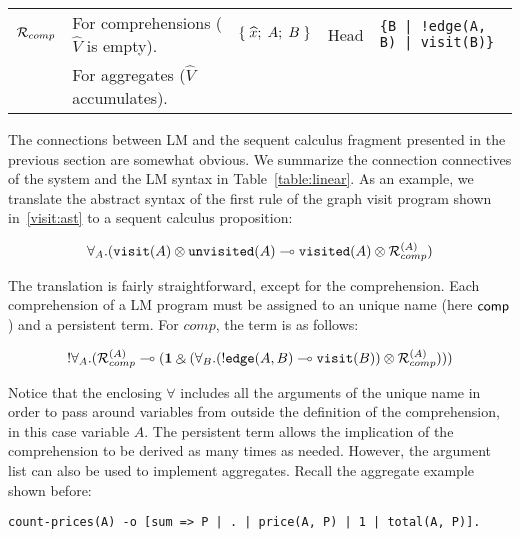 \begin{table*}
\begin{center}
{\begin{tabular}{ | l | l || l | l | l |}
    $\mathcal{R}_{comp}$               & For comprehensions
    ($\widehat{V}$ is empty).  & $\{ \; \widehat{x}; \; A; \; B \; \}$  & Head            & \texttt{\{B | !edge(A, B) | visit(B)\}}        \\
                                 & For aggregates ($\widehat{V}$ accumulates).          &                                               &                 &                                                \\ \hline
    \end{tabular}
}
\end{center}
\caption{Connectives from linear logic and their use in LM.}
\label{table:linear}
\end{table*}

The connections between LM and the sequent calculus fragment presented in the previous section
are somewhat obvious. We summarize the connection connectives of the system and
the LM syntax in Table~\ref{table:linear}. As an example, we translate the
abstract syntax of the first rule of the graph visit program shown
in~\ref{visit:ast} to a sequent calculus proposition:

\begin{align}
\forall_A. (\mathtt{visit}(A) \otimes \mathtt{unvisited}(A) \multimap
   \mathtt{visited}(A) \otimes \mathcal{R}_{comp}^{(A)})
\end{align}

The translation is fairly straightforward, except for the comprehension. Each
comprehension of a LM program must be assigned to an unique name (here
$\mathsf{comp}$) and a persistent term. For $comp$, the term is as follows:

\begin{align}
{!} \forall_A. (\mathcal{R}_{comp}^{(A)} \multimap (\mathbf{1} \mathbin{\binampersand}
         (\forall_B. ({!} \mathtt{edge}(A, B) \multimap
                                             \mathtt{visit}(B)) \otimes
          \mathcal{R}_{comp}^{(A)})))
\end{align}

Notice that the enclosing $\forall$ includes all the arguments of the unique
name in order to pass around variables from outside the definition of the
comprehension, in this case variable $A$. The persistent term allows the
implication of the comprehension to be derived as many times as needed.
However, the argument list can also be used to implement aggregates.
Recall the aggregate example shown before:

{\small
\begin{Verbatim}
count-prices(A) -o [sum => P | . | price(A, P) | 1 | total(A, P)].
\end{Verbatim}
}

